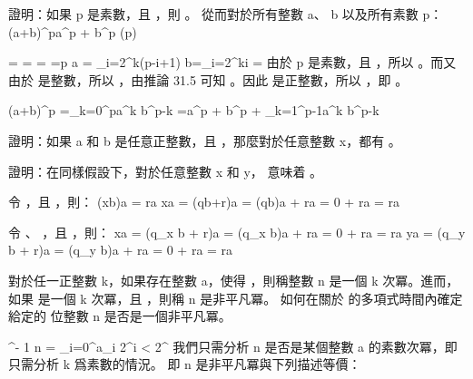 \startEXERCISE
證明：如果 p 是素數，且 ，則 。
從而對於所有整數 a、 b 以及所有素數 p：
\startformula
(a+b)^p\equiv a^p + b^p \qquad (\mod p)
\stopformula
\stopEXERCISE

\startANSWER
\startformula\startmathalignment
\NC {}
   =\NC {} \NR
\NC=\NC {} \NR
\NC=\NC {} \NR
\NC=\NC p  \qquad {} a = \prod_{i=2}^{k}(p-i+1) b=\prod_{i=2}^{k}{i} \NR
\NC=\NC {} \NR
\stopmathalignment\stopformula
由於 p 是素數，且 ，所以 。而又由於  是整數，所以 ，由推論 31.5 可知 。因此  是正整數，所以 ，即 。

\startformula\startmathalignment
\NC(a+b)^p
   =\NC \sum_{k=0}^{p}a^k b^{p-k} \NR
\NC=\NC a^p + b^p + \sum_{k=1}^{p-1}a^k b^{p-k} \NR
\stopmathalignment\stopformula
\stopANSWER

\startEXERCISE
證明：如果 a 和 b 是任意正整數，且 ，那麼對於任意整數 x，都有 。

證明：在同樣假設下，對於任意整數 x 和 y，  意味着 。
\stopEXERCISE

\startANSWER
令 ，且 ，則：
\startformula\startmathalignment[n=1]
\NC (x\mod b)\mod a = r\mod a \NR
\NC x\mod a = (qb+r)\mod a = (qb)\mod a + r\mod a = 0 + r\mod a = r\mod a \NR
\stopmathalignment\stopformula

令 、 ，且 ，則：
\startformula\startmathalignment[n=1]
\NC x\mod a = (q_x b + r)\mod a = (q_x b)\mod a + r\mod a = 0 + r\mod a = r\mod a \NR
\NC y\mod a = (q_y b + r)\mod a = (q_y b)\mod a + r\mod a = 0 + r\mod a = r\mod a \NR
\stopmathalignment\stopformula
\stopANSWER

\startEXERCISE
對於任一正整數 k，如果存在整數 a，使得 ，則稱整數 n 是一個 {\EMP k 次冪}。進而，如果  是一個 k 次冪，且 ，則稱 n 是{\EMP 非平凡冪}。
如何在關於 \m{\beta} 的多項式時間內確定給定的 \m{\beta} 位整數 n 是否是一個非平凡冪。
\stopEXERCISE

\startANSWER
{}^{\beta - 1} \le n = \sum_{i=0}^{}a_i 2^i < 2^\beta
\stopformula
我們只需分析 n 是否是某個整數 a 的素數次冪，即只需分析 k 爲素數的情況。
即 n 是非平凡冪與下列描述等價：

